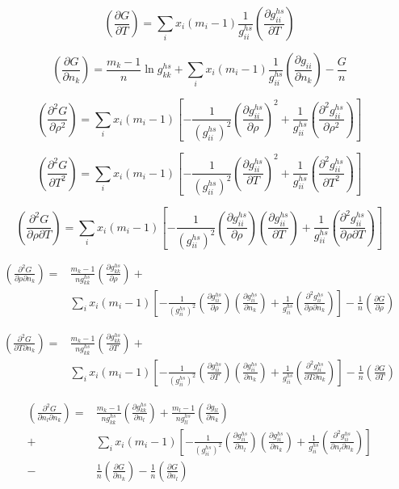 \documentclass[internal,english]{sintefmemo2012}
\newcommand*{\pder}[2]{\left(\frac{\partial #1}{\partial #2}\right)}
\newcommand*{\pdder}[2]{\left(\frac{\partial^2 #1}{\partial #2^2}\right)}
\newcommand*{\pdcross}[3]{\left(\frac{\partial^2 #1}{\partial #2 \partial #3}\right)}
\newcommand{\lp}{\left(}
\newcommand{\rp}{\right)}
\begin{document}
\begin{equation}
  \pder{G}{T} = \sum_i x_i(m_i-1) \frac{1}{g_{ii}^{hs}} \pder{g_{ii}^{hs}}{T}
\end{equation}

\begin{equation}
  \pder{G}{n_k} = \frac{m_k-1}{n}\ln g_{kk}^{hs} + \sum_i x_i (m_i-1) \frac{1}{g_{ii}^{hs}} \pder{g_{ii}}{n_k} -\frac{G}{n}
\end{equation}

\begin{equation}
  \pdder{G}{\rho} = \sum_i x_i(m_i-1) \left[ -\frac{1}{\lp g_{ii}^{hs} \rp^2} \pder{g_{ii}^{hs}}{\rho}^2 + \frac{1}{g_{ii}^{hs}} \pdder{g_{ii}^{hs}}{\rho} \right]
\end{equation}

\begin{equation}
  \pdder{G}{T} = \sum_i x_i(m_i-1) \left[ -\frac{1}{\lp g_{ii}^{hs} \rp^2} \pder{g_{ii}^{hs}}{T}^2 + \frac{1}{g_{ii}^{hs}} \pdder{g_{ii}^{hs}}{T} \right]
\end{equation}

\begin{equation}
  \pdcross{G}{\rho}{T} = \sum_i x_i(m_i-1) \left[ -\frac{1}{\lp g_{ii}^{hs} \rp^2} \pder{g_{ii}^{hs}}{\rho} \pder{g_{ii}^{hs}}{T} + \frac{1}{g_{ii}^{hs}} \pdcross{g_{ii}^{hs}}{\rho}{T} \right]
\end{equation}

\begin{align}
      \pdcross{G}{\rho}{n_k} =&  \frac{m_k-1}{n g_{kk}^{hs}} \pder{g_{kk}^{hs}}{\rho} + \\
    & \sum_i x_i(m_i-1) \left[ -\frac{1}{\lp g_{ii}^{hs} \rp^2} \pder{g_{ii}^{hs}}{\rho} \pder{g_{ii}^{hs}}{n_k} + \frac{1}{g_{ii}^{hs}} \pdcross{g_{ii}^{hs}}{\rho}{n_k} \right] -\frac{1}{n} \pder{G}{\rho}
\end{align}

\begin{equation}
  \begin{aligned}
    \pdcross{G}{T}{n_k} =& \frac{m_k-1}{n g_{kk}^{hs}} \pder{g_{kk}^{hs}}{T} + \\
    & \sum_i x_i(m_i-1) \left[ -\frac{1}{\lp g_{ii}^{hs} \rp^2} \pder{g_{ii}^{hs}}{T} \pder{g_{ii}^{hs}}{n_k} + \frac{1}{g_{ii}^{hs}} \pdcross{g_{ii}^{hs}}{T}{n_k} \right] -\frac{1}{n} \pder{G}{T}
  \end{aligned}
\end{equation}

\begin{equation}
  \begin{aligned}
    \pdcross{G}{n_l}{n_k} =& \frac{m_k-1}{n g_{kk}^{hs}} \pder{g_{kk}^{hs}}{n_l} + \frac{m_l-1}{n g_{ll}^{hs}} \pder{g_{ll}}{n_k} \\
    +& \sum_i x_i(m_i-1) \left[ -\frac{1}{\lp g_{ii}^{hs} \rp^2} \pder{g_{ii}^{hs}}{n_l} \pder{g_{ii}^{hs}}{n_k} + \frac{1}{g_{ii}^{hs}} \pdcross{g_{ii}^{hs}}{n_l}{n_k} \right] \\
    -& \frac{1}{n} \pder{G}{n_k} - \frac{1}{n} \pder{G}{n_l}
  \end{aligned}
\end{equation}
\end{document}
